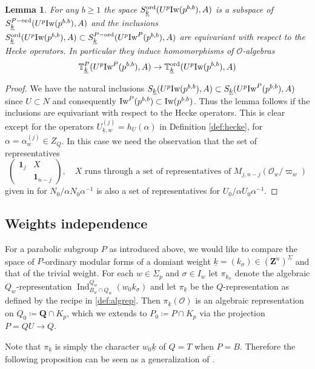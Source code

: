 \documentclass[leqno]{amsart}
\newtheorem{lem}[thm]{Lemma}
\theoremstyle{definition}
\theoremstyle{remark}
\newcommand{\id}{\mathbf{1}}
\newcommand{\oo}{\mathcal{O}}
\newcommand{\Q}{{\mathbf{Q}}}
\newcommand{\Z}{{\mathbf{Z}}}
\DeclareMathOperator{\Ind}{Ind}
\newcommand{\wt}[1]{\underline{ #1 }}
\newcommand{\Iw}{\textnormal{Iw}} %
\newcommand{\TT}{\mathbb{T}} %
\newcommand{\ord}{\textnormal{ord}} %
\begin{document}
\begin{lem}\label{lem:PtoB}
	For any $b\geq 1$
    the space $S_{\wt{k}}^{\ord}(U^p\Iw(p^{b,b}),A)$
    is a subspace of 
    $S_{\wt{k}}^{P-\ord}(U^p\Iw(p^{b,b}),A)$
	  and the inclusions
	$S_{\wt{k}}^{\ord}(U^p\Iw(p^{b,b}),A)\subset
	S_{\wt{k}}^{P-\ord}(U^p\Iw^P(p^{b,b}),A)$
    are equivariant with respect to the Hecke operators.
    In particular they induce homomorphisms of $\oo$-algebras
	\[
		\TT^P_{\wt{k}}(U^p\Iw^P(p^{b,b}),A)\to
		\TT^{\ord}_{\wt{k}}(U^p\Iw(p^{b,b}),A)
	\]
\end{lem}
\begin{proof}
	We have the natural inclusions
	$S_{\wt{k}}(U^p\Iw(p^{b,b}),A)\subset 
	S_{\wt{k}}(U^p\Iw^P(p^{b,b}),A)$
	since $U\subset N$ and consequently 
    $\Iw^P(p^{b,b})\subset \Iw(p^{b,b})$.
    Thus the lemma follows if the inclusions
	are equivariant with respect to the Hecke operators.
	This is clear except for the operators 
    $U_{\wt{k},w}^{(j)}=h_U(\alpha)$
    in Definition \ref{def:hecke},
    for $\alpha=\alpha_w^{(j)}\in Z_Q$.
    In this case we need the observation that
    the set of representatives
	\[
	\begin{pmatrix}
		\id_j&X\\&\id_{n-j}
	\end{pmatrix},\quad
	X \text{ runs through a set of representatives of }
	M_{j,n-j}(\oo_w/\varpi_w)
	\]
    given in \cite[Lem 2.10]{ger} for $N_0/\alpha N_0\alpha^{-1}$
	is also a set of representatives for 
	$U_0/\alpha U_0\alpha^{-1}$.
\end{proof}

\subsection{Weights independence}

For a parabolic subgroup $P$ as introduced above,
we would like to compare the space of 
$P$-ordinary modular forms
of a domiant weight 
$\wt{k}=(k_\sigma)\in (\Z^n)^{\Sigma}$
and that of the trivial weight.
For each $w\in\Sigma_p$ and $\sigma\in I_w$
let $\pi_{k_{\sigma}}$ denote 
the algebraic $Q_w$-representation
$\Ind_{B_w\cap Q_w}^{Q_w}(w_0 k_\sigma)$
and let $\pi_{\wt{k}}$ be the $Q$-representation
as defined by the recipe in \eqref{def:algrep}.
Then $\pi_{\wt{k}}(\oo)$ is an algebraic representation on
$Q_0\coloneqq \Q\cap K_p$,
which we extends  to $P_0\coloneqq P\cap K_p$
via the projection $P=QU\to Q$.

Note that $\pi_{\wt{k}}$
is simply the character $w_0\wt{k}$
of $Q=T$ when $P=B$.
Therefore the following proposition can be seen as
a generalization of \cite[Prop 2.22]{ger}.
\end{document}
